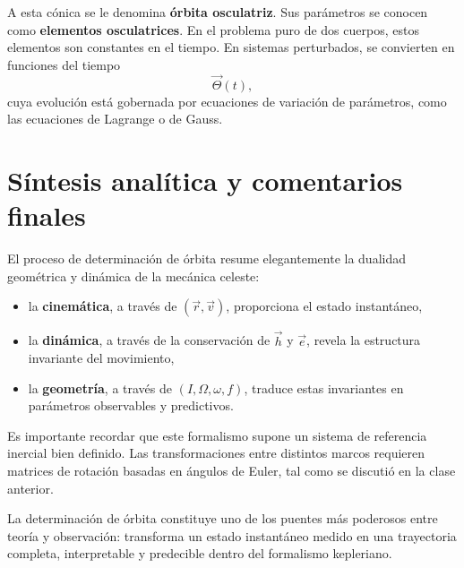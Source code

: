 A esta cónica se le denomina \textbf{órbita osculatriz}. Sus parámetros se conocen como \textbf{elementos osculatrices}. En el problema puro de dos cuerpos, estos elementos son constantes en el tiempo. En sistemas perturbados, se convierten en funciones del tiempo
\[
\vec{\Theta}(t),
\]
cuya evolución está gobernada por ecuaciones de variación de parámetros, como las ecuaciones de Lagrange o de Gauss.

\section{Síntesis analítica y comentarios finales}
El proceso de determinación de órbita resume elegantemente la dualidad geométrica y dinámica de la mecánica celeste:
\begin{itemize}
    \item la \textbf{cinemática}, a través de \((\vec{r},\vec{v})\), proporciona el estado instantáneo,
    \item la \textbf{dinámica}, a través de la conservación de \(\vec{h}\) y \(\vec{e}\), revela la estructura invariante del movimiento,
    \item la \textbf{geometría}, a través de \((I,\Omega,\omega,f)\), traduce estas invariantes en parámetros observables y predictivos.
\end{itemize}

Es importante recordar que este formalismo supone un sistema de referencia inercial bien definido. Las transformaciones entre distintos marcos requieren matrices de rotación basadas en ángulos de Euler, tal como se discutió en la clase anterior.

\begin{importante}
La determinación de órbita constituye uno de los puentes más poderosos entre teoría y observación: transforma un estado instantáneo medido en una trayectoria completa, interpretable y predecible dentro del formalismo kepleriano.
\end{importante}